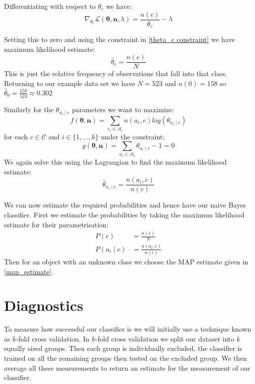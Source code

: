 Differentiating with respect to $\theta_c$ we have:
\begin{equation}
	\nabla_{\theta_c} \mathcal{L}(\mathbf{\theta}, \mathbf{n}, \lambda) = \frac{n(c)}{\theta_c} - \lambda
\end{equation}

Setting this to zero and using the constraint in \cref{theta_c constraint} we have maximum likelihood estimate:
\begin{equation}
	\hat\theta_c = \frac{n(c)}{N}
\end{equation}
This is just the relative frequency of observations that fall into that class.
Returning to our example data set we have $N=523$ and $n(0)=158$ so $\hat\theta_0 = \frac{158}{523} \approx 0.302$

Similarly for the $\theta_{a_i \mid c}$ parameters we want to maximize:
\begin{equation}
	f(\mathbf{\theta}, \mathbf{n}) = \sum_{c_i \in \mathcal{A}_i} n(a_i, c) log(\theta_{a_i \mid c})
\end{equation}
for each $c \in \mathcal{C}$ and $i \in \{1,\dots,k\}$ under the constraint:
\begin{equation}
	g(\mathbf{\theta}, \mathbf{n}) = \sum_{a_i \in \mathcal{A}_i}  \theta_{a_i \mid c} - 1 = 0
\end{equation}
We again solve this using the Lagrangian to find the maximum likelihood estimate:
\begin{equation}
	\hat\theta_{a_i \mid c} = \frac{n(a_i, c)}{n(c)}
\end{equation}

We can now estimate the required probabilities and hence have our naive Bayes classifier.
First we estimate the probabilities by taking the maximum likelihood estimate for their parametrisation:
\begin{align}
	P(c) & = \frac{n(c)}{N} \\
	P(a_i \mid c) & = \frac{n(a_i, c)}{n(c)}
\end{align}
Then for an object with an unknown class we choose the MAP estimate given in \cref{map_estimate}.

\section{Diagnostics}

To measure how successful our classifier is we will initially use a technique known as $k$-fold cross validation.
In $k$-fold cross validation we split our dataset into $k$ equally sized groups.
Then each group is individually excluded, the classifier is trained on all the remaining groups then tested on the excluded group.
We then average all these measurements to return an estimate for the measurement of our classifier.

